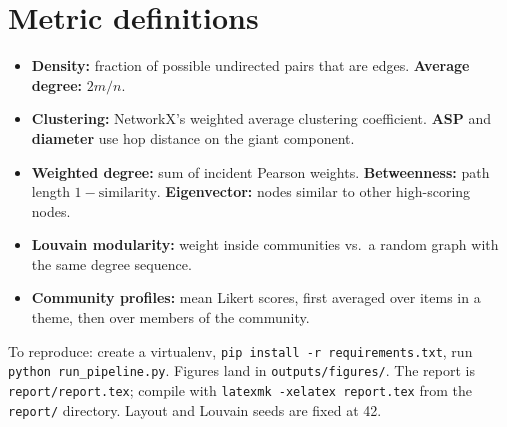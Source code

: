 \documentclass[11pt,a4paper]{article}
\begin{document}
\section{Metric definitions}

\begin{itemize}
  \item \textbf{Density:} fraction of possible undirected pairs that are edges. \textbf{Average degree:} $2m/n$.
  \item \textbf{Clustering:} NetworkX's weighted average clustering coefficient. \textbf{ASP} and \textbf{diameter} use hop distance on the giant component.
  \item \textbf{Weighted degree:} sum of incident Pearson weights. \textbf{Betweenness:} path length $1 - \text{similarity}$. \textbf{Eigenvector:} nodes similar to other high-scoring nodes.
  \item \textbf{Louvain modularity:} weight inside communities vs.\ a random graph with the same degree sequence.
  \item \textbf{Community profiles:} mean Likert scores, first averaged over items in a theme, then over members of the community.
\end{itemize}

To reproduce: create a virtualenv, \texttt{pip install -r requirements.txt}, run \texttt{python run\_pipeline.py}. Figures land in \texttt{outputs/figures/}. The report is \texttt{report/report.tex}; compile with \texttt{latexmk -xelatex report.tex} from the \texttt{report/} directory. Layout and Louvain seeds are fixed at 42.
\end{document}
